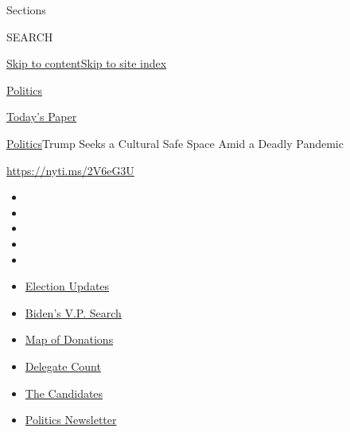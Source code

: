 Sections

SEARCH

\protect\hyperlink{site-content}{Skip to
content}\protect\hyperlink{site-index}{Skip to site index}

\href{https://www.nytimes.com/section/politics}{Politics}

\href{https://myaccount.nytimes.com/auth/login?response_type=cookie\&client_id=vi}{}

\href{https://www.nytimes.com/section/todayspaper}{Today's Paper}

\href{/section/politics}{Politics}\textbar{}Trump Seeks a Cultural Safe
Space Amid a Deadly Pandemic

\url{https://nyti.ms/2V6eG3U}

\begin{itemize}
\item
\item
\item
\item
\item
\end{itemize}

\begin{itemize}
\item
  \href{https://www.nytimes.com/2020/07/31/us/elections/biden-vs-trump.html?action=click\&pgtype=Article\&state=default\&region=TOP_BANNER\&context=storylines_menu}{Election
  Updates}
\item
  \href{https://www.nytimes.com/article/biden-vice-president-2020.html?action=click\&pgtype=Article\&state=default\&region=TOP_BANNER\&context=storylines_menu}{Biden's
  V.P. Search}
\item
  \href{https://www.nytimes.com/interactive/2020/07/24/us/politics/trump-biden-campaign-donors.html?action=click\&pgtype=Article\&state=default\&region=TOP_BANNER\&context=storylines_menu}{Map
  of Donations}
\item
  \href{https://www.nytimes.com/interactive/2020/us/elections/delegate-count-primary-results.html?action=click\&pgtype=Article\&state=default\&region=TOP_BANNER\&context=storylines_menu}{Delegate
  Count}
\item
  \href{https://www.nytimes.com/interactive/2019/us/politics/2020-presidential-candidates.html?action=click\&pgtype=Article\&state=default\&region=TOP_BANNER\&context=storylines_menu}{The
  Candidates}
\item
  \href{https://www.nytimes.com/newsletters/politics?action=click\&pgtype=Article\&state=default\&region=TOP_BANNER\&context=storylines_menu}{Politics
  Newsletter}
\end{itemize}

